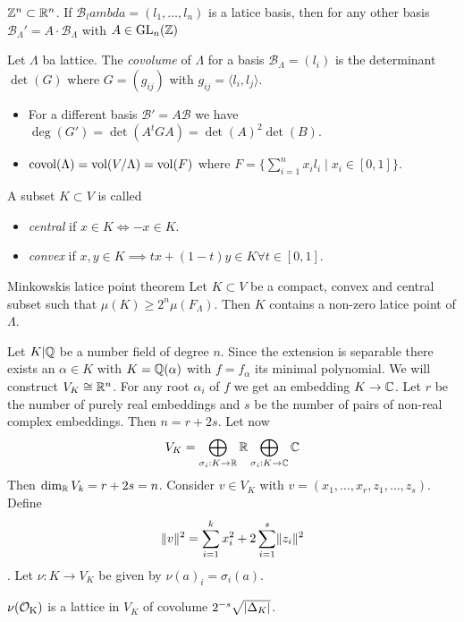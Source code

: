 \documentclass[12pt, a4paper]{article}
\newcommand{\BB}{\mathscr{B}}
\DeclareMathOperator{\covol}{covol}
\begin{document}
	\begin{ex}
		$\mathbb{Z}^n \subset \mathbb{R}^n$. If $\BB_lambda = (l_1, \dots, l_n)$ is a latice basis, 
		then for any other basis $\BB_\Lambda' = A \cdot \BB_\Lambda$ with 
		$A \in \operatorname{GL}_n(\mathbb{Z})$ 
	\end{ex}

	\begin{Def}{}{}
		Let $\Lambda$ ba lattice. The \emph{covolume} of $\Lambda$ for a basis 
		$\BB_\Lambda = (l_i)$ is the determinant $\det(G)$ where 
		$G = (g_{ij})$ with $g_{ij} = \langle l_i, l_j \rangle$.
	\end{Def}

	\begin{rem}
		\begin{itemize}
		\item For a different basis $\BB' = A\BB$ we have $\deg(G') = \det(A^t G A) =
		\det(A)^2 \det(B)$. 
		\item $\covol(\Lambda) = \vol(V/\Lambda) = \vol(F)$ where $F = 
			\{\sum_{i=1}^{n} x_il_i
		\mid x_i \in [0,1]\} $.
		\end{itemize}
	\end{rem}

	\begin{Def}{}{}
		A subset $K \subset V$ is called 
		\begin{itemize}
			\item \emph{central} if $x \in K \iff -x \in K$.
			\item \emph{convex} if $x,y \in K \implies tx + (1-t)y \in K \forall t \in [0,1]$.
		\end{itemize}
	\end{Def}

	\begin{thm}{Minkowskis latice point theorem}{}
		Let $K \subset V$ be a compact, convex and central subset such that 
		$\mu(K) \geq 2^n\mu(F_\Lambda)$. Then $K$ contains a non-zero latice point of 
		$\Lambda$.
	\end{thm}

	Let $K \vert \mathbb{Q}$ be a number field of degree $n$. Since the extension 
	is separable there exists an $\alpha \in K$ with $K = \mathbb{Q}(\alpha)$ 
	with $f = f_\alpha$ its minimal polynomial.
	We will construct $V_K \cong \mathbb{R}^n$. For any root $\alpha_i$ of $f$ 
	we get an embedding $K \to \mathbb{C}$. Let $r$ be the number of 
	purely real embeddings and $s$ be the number of pairs of non-real 
	complex embeddings. Then $n = r + 2s$. Let now 
	$$V_K = \bigoplus_{\sigma_i: K \to \mathbb{R}} \mathbb{R} \bigoplus_{\sigma_i:K \to \mathbb{C}} \mathbb{C}$$
	Then $\dim_{\mathbb{R}} V_k = r + 2s = n$. Consider $v \in V_K$ with $v = (x_1, \dots, x_r, 
	z_1, \dots, z_s)$. Define 
	$$\lVert v \rVert^2 = \sum_{i=1}^{k} x_i^2 + 2\sum_{i=1}^{s}\lVert z_i \rVert^2$$.
	Let $\nu:K\to V_K$ be given by $\nu(a)_i = \sigma_i(a)$.
	\begin{thm}{}{}
		$\nu(\operatorname{\mathcal{O}_K})$ is a lattice in $V_K$ of covolume $2^{-s}\sqrt{\lvert \Delta_K \rvert}$.
	\end{thm}
\end{document}

